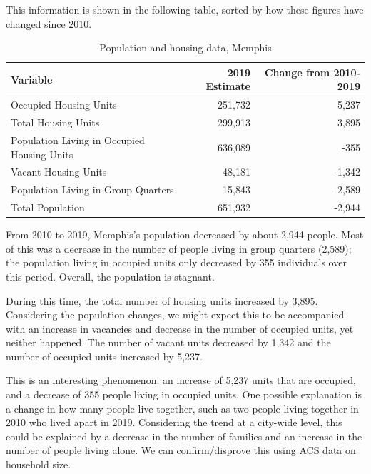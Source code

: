 \documentclass[
  openany]{book}
\begin{document}
This information is shown in the following table, sorted by how these figures have changed since 2010.

\begin{table}

\caption{\label{tab:pophsgdifference}Population and housing data, Memphis}
\centering
\begin{tabular}[t]{l|r|r}
\hline
Variable & 2019 Estimate & Change from 2010-2019\\
\hline
Occupied Housing Units & 251,732 & 5,237\\
\hline
Total Housing Units & 299,913 & 3,895\\
\hline
Population Living in Occupied Housing Units & 636,089 & -355\\
\hline
Vacant Housing Units & 48,181 & -1,342\\
\hline
Population Living in Group Quarters & 15,843 & -2,589\\
\hline
Total Population & 651,932 & -2,944\\
\hline
\end{tabular}
\end{table}

From 2010 to 2019, Memphis's population decreased by about 2,944 people. Most of this was a decrease in the number of people living in group quarters (2,589); the population living in occupied units only decreased by 355 individuals over this period. Overall, the population is stagnant.

During this time, the total number of housing units increased by 3,895. Considering the population changes, we might expect this to be accompanied with an increase in vacancies and decrease in the number of occupied units, yet neither happened. The number of vacant units decreased by 1,342 and the number of occupied units increased by 5,237.

This is an interesting phenomenon: an increase of 5,237 units that are occupied, and a decrease of 355 people living in occupied units. One possible explanation is a change in how many people live together, such as two people living together in 2010 who lived apart in 2019. Considering the trend at a city-wide level, this could be explained by a decrease in the number of families and an increase in the number of people living alone. We can confirm/disprove this using ACS data on household size.
\end{document}
